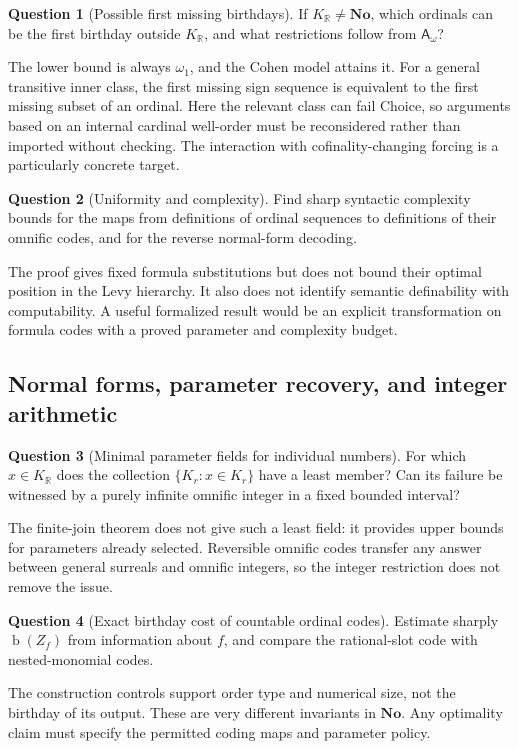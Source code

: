 \documentclass[11pt,a4paper]{article}
\numberwithin{equation}{section}
\theoremstyle{definition}
\newtheorem{question}[question]{Question}
\theoremstyle{remark}
\newcommand{\No}{\mathbf{No}}
\newcommand{\R}{\mathbb R}
\newcommand{\bd}{\operatorname{b}}
\newcommand{\KR}{K_{\R}}
\newcommand{\Asm}{\mathsf A_{\omega}}
\begin{document}
\begin{question}[Possible first missing birthdays]
If $\KR\ne\No$, which ordinals can be the first birthday outside
$\KR$, and what restrictions follow from $\Asm$?
\end{question}
The lower bound is always $\omega_1$, and the Cohen model attains it.
For a general transitive inner class, the first missing sign sequence
is equivalent to the first missing subset of an ordinal. Here the
relevant class can fail Choice, so arguments based on an internal
cardinal well-order must be reconsidered rather than imported without
checking. The interaction with cofinality-changing forcing is a
particularly concrete target.

\begin{question}[Uniformity and complexity]
Find sharp syntactic complexity bounds for the maps from definitions
of ordinal sequences to definitions of their omnific codes, and for
the reverse normal-form decoding.
\end{question}
The proof gives fixed formula substitutions but does not bound their
optimal position in the Levy hierarchy. It also does not identify
semantic definability with computability. A useful formalized result
would be an explicit transformation on formula codes with a proved
parameter and complexity budget.

\subsection{Normal forms, parameter recovery, and integer arithmetic}

\begin{question}[Minimal parameter fields for individual numbers]
For which $x\in\KR$ does the collection
$\{K_r:x\in K_r\}$ have a least member? Can its failure be witnessed
by a purely infinite omnific integer in a fixed bounded interval?
\end{question}
The finite-join theorem does not give such a least field: it provides
upper bounds for parameters already selected. Reversible omnific
codes transfer any answer between general surreals and omnific
integers, so the integer restriction does not remove the issue.

\begin{question}[Exact birthday cost of countable ordinal codes]
Estimate sharply $\bd(Z_f)$ from information about $f$, and compare
the rational-slot code with nested-monomial codes.
\end{question}
The construction controls support order type and numerical size, not
the birthday of its output. These are very different invariants in
$\No$. Any optimality claim must specify the permitted coding maps and
parameter policy.
\end{document}

